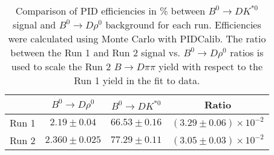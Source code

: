 \begin{table}
    \centering
    \begin{tabular}{cccc}
        \toprule
        & $B^0 \to D\rho^0$ & $B^0 \to DK^{*0}$ & Ratio \\
        \midrule
Run 1 & $2.19 \pm 0.04$ & $66.53 \pm 0.16$ & $(3.29 \pm 0.06) \times 10^{-2}$ \\
Run 2 & $2.360 \pm 0.025$ & $77.29 \pm 0.11$ & $(3.05 \pm 0.03) \times 10^{-2}$ \\
      \bottomrule
        \end{tabular}
        \caption{Comparison of PID efficiencies in \% between $B^0 \to DK^{*0}$ signal and $B^0 \to D\rho^0$ background for each run. Efficiencies were calculated using Monte Carlo with PIDCalib. The ratio between the Run 1 and Run 2 signal vs. $B^0 \to D\rho^0$ ratios is used to scale the Run 2 $B \to D\pi\pi$ yield with respect to the Run 1 yield in the fit to data.}
\label{tab:rho_PID_eff}
\end{table}
